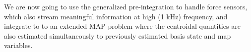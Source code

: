 We are now going to use the generalized pre-integration to handle force sensors, which also
stream meaningful information at high (1 kHz) frequency, and integrate to
to an extended MAP problem where the centroidal quantities are also estimated
simultaneously to previously estimated basis state and map variables.

